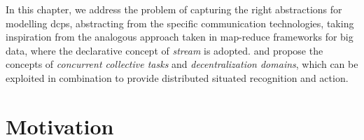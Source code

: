 In this chapter, 
 we address the problem of capturing the right abstractions for modelling \acp{dcp},
 abstracting from the specific communication technologies, 
 taking inspiration from the analogous 
 approach taken in map-reduce frameworks for big data, 
 where the declarative concept of \emph{stream} is adopted.
%
and propose the concepts of \emph{concurrent collective tasks} 
 and \emph{decentralization domains}, %
 which can be exploited in combination to provide distributed situated recognition and action.
%
\section{Motivation}\label{sec:motiv}


